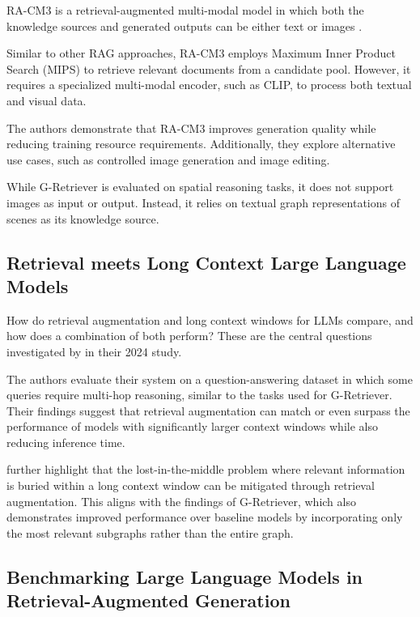 RA-CM3 is a retrieval-augmented multi-modal model in which both the knowledge sources and generated outputs can be either text or images \cite{multimodal}.

Similar to other RAG approaches, RA-CM3 employs Maximum Inner Product Search (MIPS) to retrieve relevant documents from a candidate pool. However, it requires a specialized multi-modal encoder, such as CLIP, to process both textual and visual data.

The authors demonstrate that RA-CM3 improves generation quality while reducing training resource requirements. Additionally, they explore alternative use cases, such as controlled image generation and image editing.

While G-Retriever is evaluated on spatial reasoning tasks, it does not support images as input or output. Instead, it relies on textual graph representations of scenes as its knowledge source.

\subsection{Retrieval meets Long Context Large Language Models}

How do retrieval augmentation and long context windows for LLMs compare, and how does a combination of both perform?
These are the central questions investigated by \citet{Xu2023RetrievalML} in their 2024 study.

The authors evaluate their system on a question-answering dataset in which some queries require multi-hop reasoning, similar to the tasks used for G-Retriever.
Their findings suggest that retrieval augmentation can match or even surpass the performance of models with significantly larger context windows while also reducing inference time.

\citet{Xu2023RetrievalML} further highlight that the lost-in-the-middle problem \textemdash{} where relevant information is buried within a long context window \textemdash{} can be mitigated through retrieval augmentation.
This aligns with the findings of G-Retriever, which also demonstrates improved performance over baseline models by incorporating only the most relevant subgraphs rather than the entire graph.


\subsection{Benchmarking Large Language Models in Retrieval-Augmented Generation}

